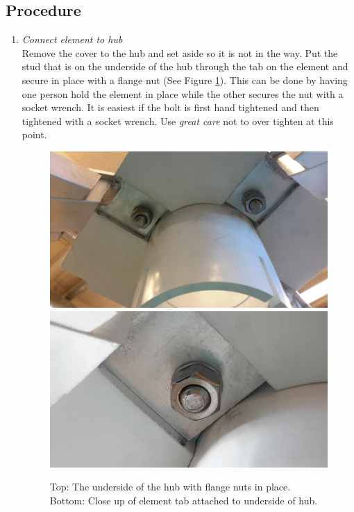 \documentclass[12pt]{article}
\begin{document}
\begin{enumerate}
	\subsection{Procedure}
		\begin{enumerate}
			\item \emph{Connect element to hub} \\ Remove the cover to the hub and set aside so it is not in the way. Put the stud that is on the underside of the hub through the tab on the element and secure in place with a flange nut (See Figure \ref{UnderHub}). This can be done by having one person hold the element in place while the other secures the nut with a socket wrench. It is easiest if the bolt is first hand tightened and then tightened with a socket wrench. Use \emph{great care} not to over tighten at this point.
			
\begin{figure}[!h]
	\center
	\includegraphics[width=\linewidth]{20141125_110653.jpg}
	\includegraphics[width=\linewidth]{20141212_153321.jpg}
	\caption{Top: The underside of the hub with flange nuts in place. Bottom: Close up of element tab attached to underside of hub. \label{UnderHub}}
\end{figure}	


\end{enumerate}
\end{enumerate}
\end{document}
